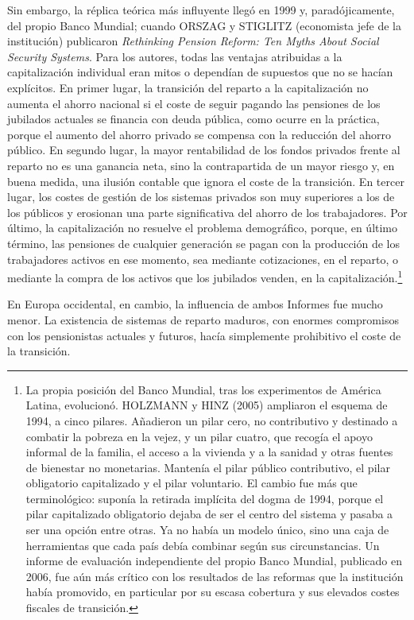 \documentclass[10pt,a4paper]{article}
\begin{document}
Sin embargo, la réplica teórica más influyente llegó en 1999 y, paradójicamente, del propio Banco Mundial; cuando ORSZAG y STIGLITZ (economista jefe de la institución) publicaron \textit{Rethinking Pension Reform: Ten Myths About Social Security Systems}. Para los autores, todas las ventajas atribuidas a la capitalización individual eran mitos o dependían de supuestos que no se hacían explícitos. En primer lugar, la transición del reparto a la capitalización no aumenta el ahorro nacional si el coste de seguir pagando las pensiones de los jubilados actuales se financia con deuda pública, como ocurre en la práctica, porque el aumento del ahorro privado se compensa con la reducción del ahorro público. En segundo lugar, la mayor rentabilidad de los fondos privados frente al reparto no es una ganancia neta, sino la contrapartida de un mayor riesgo y, en buena medida, una ilusión contable que ignora el coste de la transición. En tercer lugar, los costes de gestión de los sistemas privados son muy superiores a los de los públicos y erosionan una parte significativa del ahorro de los trabajadores. Por último, la capitalización no resuelve el problema demográfico, porque, en último término, las pensiones de cualquier generación se pagan con la producción de los trabajadores activos en ese momento, sea mediante cotizaciones, en el reparto, o mediante la compra de los activos que los jubilados venden, en la capitalización.\footnote{%
    La propia posición del Banco Mundial, tras los experimentos de América Latina, evolucionó. HOLZMANN y HINZ (2005) ampliaron el esquema de 1994, a cinco pilares. Añadieron un pilar cero, no contributivo y destinado a combatir la pobreza en la vejez, y un pilar cuatro, que recogía el apoyo informal de la familia, el acceso a la vivienda y a la sanidad y otras fuentes de bienestar no monetarias. Mantenía el pilar público contributivo, el pilar obligatorio capitalizado y el pilar voluntario. El cambio fue más que terminológico: suponía la retirada implícita del dogma de 1994, porque el pilar capitalizado obligatorio dejaba de ser el centro del sistema y pasaba a ser una opción entre otras. Ya no había un modelo único, sino una caja de herramientas que cada país debía combinar según sus circunstancias. Un informe de evaluación independiente del propio Banco Mundial, publicado en 2006, fue aún más crítico con los resultados de las reformas que la institución había promovido, en particular por su escasa cobertura y sus elevados costes fiscales de transición.
}

En Europa occidental, en cambio, la influencia de ambos Informes fue mucho menor. La existencia de sistemas de reparto maduros, con enormes compromisos con los pensionistas actuales y futuros, hacía simplemente prohibitivo el coste de la transición.
\end{document}
